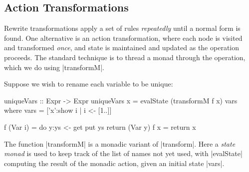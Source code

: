 \begin{comment}
\noindent Or alternatively, making use of GHC's pattern-guards:

\ignore\begin{code}
f (Add  x y) | Val x'  <- f x, Val y' <- f y = Val (x'+y')
f (Mul  x y) | Val 1   <- f x = f y
\end{code}

We have both explicitly continued the execution \textit{before} performing a pattern match, and in the last branch where a leaf is returned, we explicitly continue \textit{afterwards}.

We consider top-down transformations to be more complex and less useful than bottom-up traversals, and we do not include them in our library. A previous version of our library did include top-down traversals, but we found they were rarely the correct choice. We discovered that most uses of top-down traversals were to model rewrites where information was pushed down, and it was easy to get the definition wrong in corner cases. This experience lead us to the decision that top-down traversals do not deserve library support. We include |rewrite| but suspect that most users would be better off using |transform|, modified as described above.
\end{comment}

\subsection{Action Transformations}

Rewrite transformations apply a set of rules \textit{repeatedly} until a normal form is found. One alternative is an action transformation, where each node is visited and transformed \textit{once}, and state is maintained and updated as the operation proceeds. The standard technique is to thread a monad through the operation, which we do using |transformM|.

\begin{example}
Suppose we wish to rename each variable to be unique:

\begin{code}
uniqueVars :: Expr -> Expr
uniqueVars x = evalState (transformM f x) vars
    where
        vars = ['x':show i | i <- [1..]]

        f (Var i)  = do  y:ys <- get
                         put ys
                         return (Var y)
        f x        = return x
\end{code}

The function |transformM| is a monadic variant of |transform|. Here a \textit{state monad} is used to keep track of the list of names not yet used, with |evalState| computing the result of the monadic action, given an initial state |vars|.
\end{example}

